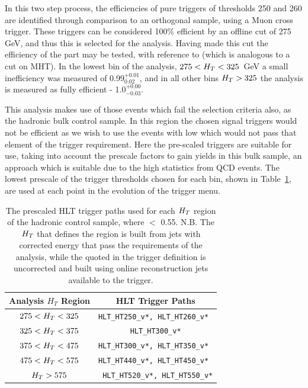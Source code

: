 In this two step process, the efficiencies of pure \HT triggers of thresholds 250 and 260 are identified through comparison to an orthogonal sample, using a Muon \HT cross trigger. These triggers can be considered 100\% efficient by an offline \HT cut of 275 GeV, and thus this is selected for the analysis. Having made this cut the efficiency of the \MHT part may be tested, with reference to \alt (which is analogous to a cut on MHT). In the lowest bin of the analysis, $275 < H_{T}  < 325$~GeV a small inefficiency was measured of 0.99$^{+0.01}_{0.02}$, and in all other bins $H_{T}  > 325$ the analysis is measured as fully efficient - 1.0$^{+0.00}_{-0.03}$.

This analysis makes use of those events which fail the \alt selection criteria also, as the hadronic bulk control sample. In this region the chosen signal triggers would not be efficient as we wish to use the events with low \MHT which would not pass that element of the trigger requirement. Here the pre-scaled \HT triggers are suitable for use, taking into account the prescale factors to gain yields in this bulk sample, an approach which is suitable due to the high statistics from QCD events. The lowest prescale of the trigger thresholds chosen for each \HT bin, shown in Table~\ref{tab:bulktrig}, are used at each point in the evolution of the trigger menu.


\begin{table}[htbp]
\centering
\begin{tabular}{ c c }
\hline
\hline
Analysis $H_{T}$ Region & HLT Trigger Paths\\
\hline
\hline
$275 < H_{T}  < 325$ & \verb!HLT_HT250_v*, HLT_HT260_v* !\\
$325 < H_{T}  < 375$ & \verb!HLT_HT300_v*!\\
$375 < H_{T}  < 475$ & \verb!HLT_HT300_v*, HLT_HT350_v* !\\
$475 < H_{T}  < 575$ &\verb!HLT_HT440_v*, HLT_HT450_v* !\\
$H_{T}  > 575$ & \verb! HLT_HT520_v*, HLT_HT550_v*!\\
\hline
\end{tabular}
\caption{\label{tab:bulktrig}The prescaled HLT trigger paths used for each $H_{T} $ region of the hadronic control sample, where \alt $<$ 0.55. N.B. The $H_{T} $ that defines the region is built from jets with corrected energy that pass the requirements of the analysis, while the \HT quoted in the trigger definition is uncorrected and built using online reconstruction jets available to the trigger.}
\end{table}



